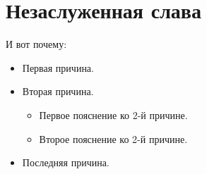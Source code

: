 
\section{Незаслуженная слава}

И вот почему:

\begin{itemize}
  \item Первая причина.
  \item Вторая причина.
    \begin{itemize}
      \item Первое пояснение ко 2-й причине.
      \item Второе пояснение ко 2-й причине.
    \end{itemize}
  \item Последняя причина.
\end{itemize}
